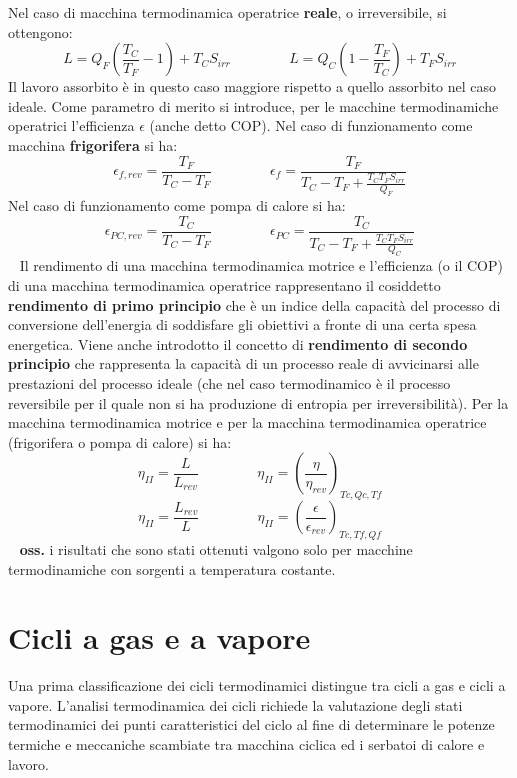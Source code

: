 Nel caso di macchina termodinamica operatrice \textbf{reale}, o irreversibile, si ottengono: 
\[
    L = Q_F\left(\frac{T_C}{T_F}-1\right) + T_C S_{irr} \;\;\;\;\;\;\;\;\;\;\;\;\;\;\; L = Q_C \left(1- \frac{T_F}{T_C}\right) + T_F S_{irr}
\]
Il lavoro assorbito è in questo caso maggiore rispetto a quello assorbito nel caso ideale. \newline
\newline
Come parametro di merito si introduce, per le macchine termodinamiche operatrici
l’efficienza $\epsilon$ (anche detto COP). \newline
\newline
Nel caso di funzionamento come macchina \textbf{frigorifera} si ha: 
\[
    \epsilon_{f,rev} = \frac{T_F}{T_C-T_F} \;\;\;\;\;\;\;\;\;\;\;\;\;\;\; \epsilon_{f} = \frac{T_F}{T_C-T_F + \frac{T_CT_FS_{irr}}{Q_F}}
\]
Nel caso di funzionamento come pompa di calore si ha:
\[
    \epsilon_{PC, rev} = \frac{T_C}{T_C-T_F} \;\;\;\;\;\;\;\;\;\;\;\;\;\;\; \epsilon_{PC} = \frac{T_C}{T_C-T_F + \frac{T_CT_FS_{irr}}{Q_C}}
\]
\ \newline
Il rendimento di una macchina termodinamica motrice e l’efficienza (o il COP) di una
macchina termodinamica operatrice rappresentano il cosiddetto \textbf{rendimento di primo
principio} che è un indice della capacità del processo di conversione dell’energia di soddisfare
gli obiettivi a fronte di una certa spesa energetica. \newline
\newline
Viene anche introdotto il concetto di \textbf{rendimento di secondo principio} che rappresenta la
capacità di un processo reale di avvicinarsi alle prestazioni del processo ideale (che nel caso
termodinamico è il processo reversibile per il quale non si ha produzione di entropia per
irreversibilità). Per la macchina termodinamica motrice e per la macchina termodinamica
operatrice (frigorifera o pompa di calore) si ha: 
\[
    \eta_{II} = \frac{L}{L_{rev}} \;\;\;\;\;\;\;\;\;\;\;\;\;\;\; \eta_{II} = \left(\frac{\eta}{\eta_{rev}}\right)_{Tc, Qc, Tf}
\]
\[
    \eta_{II} = \frac{L_{rev}}{L} \;\;\;\;\;\;\;\;\;\;\;\;\;\;\; \eta_{II} = \left(\frac{\epsilon}{\epsilon_{rev}}\right)_{Tc,Tf,Qf}
\]
\ \newline
\textbf{oss.} i risultati che sono stati ottenuti valgono solo per macchine termodinamiche con
sorgenti a temperatura costante. 






\section{Cicli a gas e a vapore}
Una prima classificazione dei cicli termodinamici distingue tra cicli a gas e cicli a vapore.
L’analisi termodinamica dei cicli richiede la valutazione degli stati termodinamici dei punti
caratteristici del ciclo al fine di determinare le potenze termiche e meccaniche scambiate tra
macchina ciclica ed i serbatoi di calore e lavoro.
